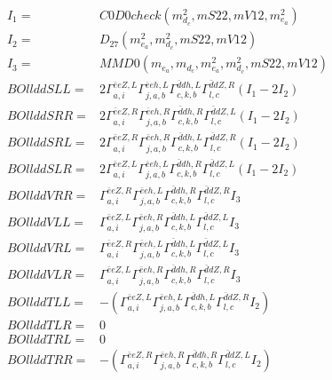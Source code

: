 \documentclass[A4,landscape]{article}
\begin{document}
\begin{align} 
I_1 = & C0D0check(m^2_{d_{{c}}}, mS22, mV12, m^2_{e_{{a}}}) \\ 
I_2 = & D_{27}(m^2_{e_{{a}}}, m^2_{d_{{c}}}, mS22, mV12) \\ 
I_3 = & MMD0(m_{e_{{a}}}, m_{d_{{c}}}, m^2_{e_{{a}}}, m^2_{d_{{c}}}, mS22, mV12) \\ 
  BOllddSLL= & 2  \Gamma^{\bar{e}e Z ,L}_{a, i} \Gamma^{\bar{e}e h ,L}_{j, a, b} \Gamma^{\bar{d}d h ,L}_{c, k, b} \Gamma^{\bar{d}d Z ,R}_{l, c} (I_1 - 2 I_2) \\ 
  BOllddSRR= & 2  \Gamma^{\bar{e}e Z ,R}_{a, i} \Gamma^{\bar{e}e h ,R}_{j, a, b} \Gamma^{\bar{d}d h ,R}_{c, k, b} \Gamma^{\bar{d}d Z ,L}_{l, c} (I_1 - 2 I_2) \\ 
  BOllddSRL= & 2  \Gamma^{\bar{e}e Z ,R}_{a, i} \Gamma^{\bar{e}e h ,R}_{j, a, b} \Gamma^{\bar{d}d h ,L}_{c, k, b} \Gamma^{\bar{d}d Z ,R}_{l, c} (I_1 - 2 I_2) \\ 
  BOllddSLR= & 2  \Gamma^{\bar{e}e Z ,L}_{a, i} \Gamma^{\bar{e}e h ,L}_{j, a, b} \Gamma^{\bar{d}d h ,R}_{c, k, b} \Gamma^{\bar{d}d Z ,L}_{l, c} (I_1 - 2 I_2) \\ 
  BOllddVRR= &  \Gamma^{\bar{e}e Z ,R}_{a, i} \Gamma^{\bar{e}e h ,L}_{j, a, b} \Gamma^{\bar{d}d h ,R}_{c, k, b} \Gamma^{\bar{d}d Z ,R}_{l, c} I_3 \\ 
  BOllddVLL= &  \Gamma^{\bar{e}e Z ,L}_{a, i} \Gamma^{\bar{e}e h ,R}_{j, a, b} \Gamma^{\bar{d}d h ,L}_{c, k, b} \Gamma^{\bar{d}d Z ,L}_{l, c} I_3 \\ 
  BOllddVRL= &  \Gamma^{\bar{e}e Z ,R}_{a, i} \Gamma^{\bar{e}e h ,L}_{j, a, b} \Gamma^{\bar{d}d h ,L}_{c, k, b} \Gamma^{\bar{d}d Z ,L}_{l, c} I_3 \\ 
  BOllddVLR= &  \Gamma^{\bar{e}e Z ,L}_{a, i} \Gamma^{\bar{e}e h ,R}_{j, a, b} \Gamma^{\bar{d}d h ,R}_{c, k, b} \Gamma^{\bar{d}d Z ,R}_{l, c} I_3 \\ 
  BOllddTLL= & -( \Gamma^{\bar{e}e Z ,L}_{a, i} \Gamma^{\bar{e}e h ,L}_{j, a, b} \Gamma^{\bar{d}d h ,L}_{c, k, b} \Gamma^{\bar{d}d Z ,R}_{l, c} I_2) \\ 
  BOllddTLR= & 0 \\ 
  BOllddTRL= & 0 \\ 
  BOllddTRR= & -( \Gamma^{\bar{e}e Z ,R}_{a, i} \Gamma^{\bar{e}e h ,R}_{j, a, b} \Gamma^{\bar{d}d h ,R}_{c, k, b} \Gamma^{\bar{d}d Z ,L}_{l, c} I_2) \\ 
\end{align} 
\end{document}
